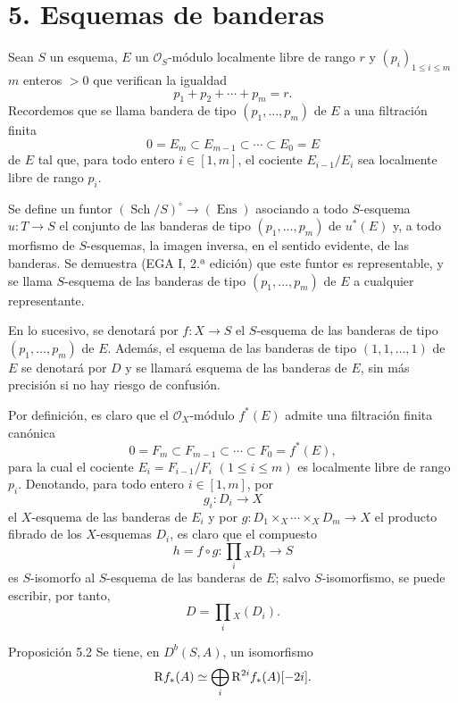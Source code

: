 \section*{5. Esquemas de banderas}

Sean $S$ un esquema, $E$ un $\mathcal O_S$-módulo localmente libre de rango $r$ y $(p_i)_{1\le i\le m}$ $m$ enteros $>0$ que verifican la igualdad
\[
p_1+p_2+\cdots+p_m=r.
\]
Recordemos que se llama bandera de tipo $(p_1,\ldots,p_m)$ de $E$ a una filtración finita
\[
0=E_m\subset E_{m-1}\subset\cdots\subset E_0=E
\]
de $E$ tal que, para todo entero $i\in[1,m]$, el cociente $E_{i-1}/E_i$ sea localmente libre de rango $p_i$.

Se define un funtor $(\operatorname{Sch}/S)^\circ\to(\operatorname{Ens})$ asociando a todo $S$-esquema $u:T\to S$ el conjunto de las banderas de tipo $(p_1,\ldots,p_m)$ de $u^*(E)$ y, a todo morfismo de $S$-esquemas, la imagen inversa, en el sentido evidente, de las banderas. Se demuestra (EGA I, 2.ª edición) que este funtor es representable, y se llama $S$-esquema de las banderas de tipo $(p_1,\ldots,p_m)$ de $E$ a cualquier representante.

En lo sucesivo, se denotará por $f:X\to S$ el $S$-esquema de las banderas de tipo $(p_1,\ldots,p_m)$ de $E$. Además, el esquema de las banderas de tipo $(1,1,\ldots,1)$ de $E$ se denotará por $D$ y se llamará esquema de las banderas de $E$, sin más precisión si no hay riesgo de confusión.

Por definición, es claro que el $\mathcal O_X$-módulo $f^*(E)$ admite una filtración finita canónica
\[
0=F_m\subset F_{m-1}\subset\cdots\subset F_0=f^*(E),
\]
para la cual el cociente $E_i=F_{i-1}/F_i$ $(1\le i\le m)$ es localmente libre de rango $p_i$. Denotando, para todo entero $i\in[1,m]$, por
\[
g_i:D_i\to X
\]
el $X$-esquema de las banderas de $E_i$ y por $g:D_1\times_X\cdots\times_X D_m\to X$ el producto fibrado de los $X$-esquemas $D_i$, es claro que el compuesto
\[
h=f\circ g:\prod_i{}_XD_i\to S
\tag{5.1}
\]
es $S$-isomorfo al $S$-esquema de las banderas de $E$; salvo $S$-isomorfismo, se puede escribir, por tanto,
\[
D=\prod_i{}_X(D_i).
\]

\begin{statement}{Proposición 5.2}
Se tiene, en $D^b(S,A)$, un isomorfismo
\[
\mathrm{R} f_*(A)\simeq\bigoplus_i \mathrm{R}^{2i}f_*(A)[-2i].
\]
\end{statement}
